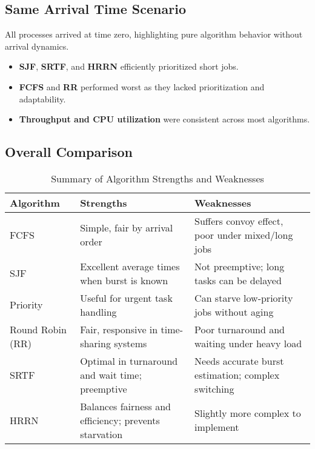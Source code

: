 \documentclass[conference]{report}
\begin{document}
\subsection*{Same Arrival Time Scenario}
All processes arrived at time zero, highlighting pure algorithm behavior without arrival dynamics.

\begin{itemize}
    \item \textbf{SJF}, \textbf{SRTF}, and \textbf{HRRN} efficiently prioritized short jobs.
    \item \textbf{FCFS} and \textbf{RR} performed worst as they lacked prioritization and adaptability.
    \item \textbf{Throughput and CPU utilization} were consistent across most algorithms.
\end{itemize}

\subsection*{Overall Comparison}
\begin{table}[h!]
    \centering
    \begin{tabular}{|l|p{4.5cm}|p{4.5cm}|}
        \hline
            \textbf{Algorithm} & \textbf{Strengths} & \textbf{Weaknesses} \\
        \hline
            FCFS & Simple, fair by arrival order & Suffers convoy effect, poor under mixed/long jobs \\
        \hline
            SJF & Excellent average times when burst is known & Not preemptive; long tasks can be delayed \\
        \hline
            Priority & Useful for urgent task handling & Can starve low-priority jobs without aging \\
        \hline
            Round Robin (RR) & Fair, responsive in time-sharing systems & Poor turnaround and waiting under heavy load \\
        \hline
            SRTF & Optimal in turnaround and wait time; preemptive & Needs accurate burst estimation; complex switching \\
        \hline
            HRRN & Balances fairness and efficiency; prevents starvation & Slightly more complex to implement \\
        \hline
        \end{tabular}
    \caption{Summary of Algorithm Strengths and Weaknesses}
    \label{tab:algorithm-summary}
\end{table}
\end{document}
